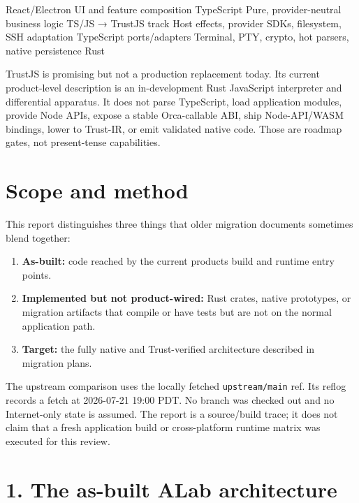 \documentclass[
  10pt,
  letterpaper,
]{article}
\newenvironment{Shaded}{\begin{snugshade}}{\end{snugshade}}
\newcommand{\NormalTok}[1]{#1}
\providecommand{\tightlist}{%
  \setlength{\itemsep}{0pt}\setlength{\parskip}{0pt}}
\begin{document}
\begin{Shaded}
\begin{Highlighting}[]
\NormalTok{React/Electron UI and feature composition                 TypeScript}
\NormalTok{Pure, provider{-}neutral business logic                     TS/JS → TrustJS track}
\NormalTok{Host effects, provider SDKs, filesystem, SSH adaptation   TypeScript ports/adapters}
\NormalTok{Terminal, PTY, crypto, hot parsers, native persistence    Rust}
\end{Highlighting}
\end{Shaded}

TrustJS is promising but not a production replacement today. Its current
product-level description is an in-development Rust JavaScript
interpreter and differential apparatus. It does not parse TypeScript,
load application modules, provide Node APIs, expose a stable
Orca-callable ABI, ship Node-API/WASM bindings, lower to Trust-IR, or
emit validated native code. Those are roadmap gates, not present-tense
capabilities.

\section{Scope and method}\label{scope-and-method}

This report distinguishes three things that older migration documents
sometimes blend together:

\begin{enumerate}
\def\labelenumi{\arabic{enumi}.}
\tightlist
\item
  \textbf{As-built:} code reached by the current
  product\textquotesingle s build and runtime entry points.
\item
  \textbf{Implemented but not product-wired:} Rust crates, native
  prototypes, or migration artifacts that compile or have tests but are
  not on the normal application path.
\item
  \textbf{Target:} the fully native and Trust-verified architecture
  described in migration plans.
\end{enumerate}

The upstream comparison uses the locally fetched \texttt{upstream/main}
ref. Its reflog records a fetch at 2026-07-21 19:00 PDT. No branch was
checked out and no Internet-only state is assumed. The report is a
source/build trace; it does not claim that a fresh application build or
cross-platform runtime matrix was executed for this review.

\section{1. The as-built ALab
architecture}\label{1-the-as-built-alab-architecture}
\end{document}
